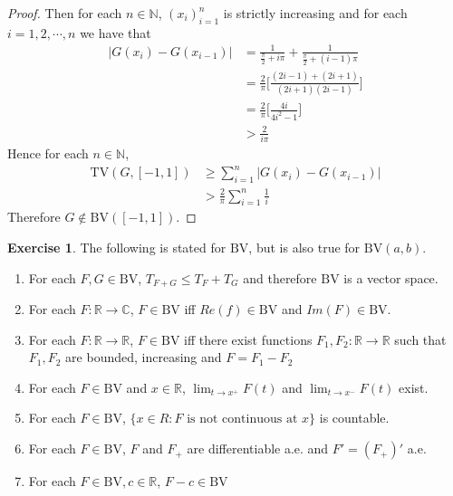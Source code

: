 \documentclass{book}
\theoremstyle{definition}
\newtheorem{ex}[definition]{Exercise}
\newcommand{\C}{\mathbb{C}}
\newcommand{\N}{\mathbb{N}}
\newcommand{\R}{\mathbb{R}}
\newcommand{\lex}[1]{\label{ex:#1}}
\DeclareMathOperator*{\0}{\mbf{0}}
\DeclareMathOperator*{\1}{\mbf{1}}
\newcommand{\BV}{\text{BV}}
\newcommand{\TV}{\text{TV}}
\begin{document}
\begin{proof}
		Then for each $n \in \N$, $(x_i)_{i=1}^n$ is strictly increasing and for each $i=1,2,\cdots, n$ we have that 
		\begin{align*}
			|G(x_i)-G(x_{i-1})|
			&=\frac{1}{\frac{\pi}{2}+i\pi}+ \frac{1}{\frac{\pi}{2}+(i-1)\pi}\\
			&=\frac{2}{\pi}\bigg[\frac{(2i-1)+(2i+1)}{(2i+1)(2i-1)}\bigg]\\
			&=\frac{2}{\pi}\bigg[\frac{4i}{4i^2-1}\bigg]\\
			& > \frac{2}{i\pi}
		\end{align*}
		\newpage
		Hence for each $n \in \N$,
		\begin{align*}
			\TV(G,[-1,1]) 
			&\geq \sum_{i=1}^n|G(x_i)-G(x_{i-1})| \\
			& > \frac{2}{\pi}\sum_{i=1}^n \frac{1}{i}
		\end{align*}
		Therefore $G \not \in \BV([-1,1])$.
	\end{proof}
	
	\begin{ex} \lex{00000}  The following is stated for $\BV$, but is also true for $\BV(a,b)$.
		
		\begin{enumerate} 
			\item For each $F,G \in \BV$, $T_{F+G} \leq T_F + T_G$ and therefore $\BV$ is a vector space. 
			\item For each $F: \R \rightarrow \C$, $F \in \BV$ iff $Re(f) \in \BV$ and $Im(F) \in \BV$.
			\item For each $F:\R \rightarrow \R$, $F \in \BV$ iff there exist functions $F_1,F_2:\R \rightarrow \R$ such that $F_1,F_2$ are bounded, increasing and $F=F_1-F_2$
			\item For each $F \in \BV$ and $x \in \R$, $\lim_{t \rightarrow x^+}F(t)$ and $\lim_{t \rightarrow x^-}F(t)$ exist. 
			\item For each $F \in \BV$, $\{x \in R: F \text{ is not continuous at }x\}$ is countable.
			\item For each $F \in \BV$, $F$ and $F_+$ are differentiable a.e. and $F'=(F_+)'$ a.e.
			\item For each $F \in \BV, c \in \R$, $F-c \in \BV$
		\end{enumerate}
	\end{ex}
	
\end{document}
